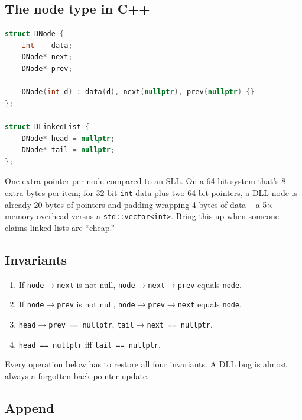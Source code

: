 \documentclass[11pt]{article}
\begin{document}
\subsection{The node type in C++}

\begin{examplebox}
\begin{lstlisting}[basicstyle=\ttfamily\small,frame=single,language=C++]
struct DNode {
    int    data;
    DNode* next;
    DNode* prev;

    DNode(int d) : data(d), next(nullptr), prev(nullptr) {}
};

struct DLinkedList {
    DNode* head = nullptr;
    DNode* tail = nullptr;
};
\end{lstlisting}
One extra pointer per node compared to an SLL. On a 64-bit system
that's 8 extra bytes per item; for 32-bit \texttt{int} data plus
two 64-bit pointers, a DLL node is already 20 bytes of pointers
and padding wrapping 4 bytes of data -- a 5$\times$ memory
overhead versus a \texttt{std::vector<int>}. Bring this up when
someone claims linked lists are ``cheap.''
\end{examplebox}

\subsection{Invariants}

\begin{ideabox}
\begin{enumerate}[leftmargin=*]
  \item If \texttt{node$\to$next} is not null,
        \texttt{node$\to$next$\to$prev} equals \texttt{node}.
  \item If \texttt{node$\to$prev} is not null,
        \texttt{node$\to$prev$\to$next} equals \texttt{node}.
  \item \texttt{head$\to$prev == nullptr}, \texttt{tail$\to$next == nullptr}.
  \item \texttt{head == nullptr} iff \texttt{tail == nullptr}.
\end{enumerate}
Every operation below has to restore all four invariants. A DLL
bug is almost always a forgotten back-pointer update.
\end{ideabox}

\subsection{Append}
\end{document}

